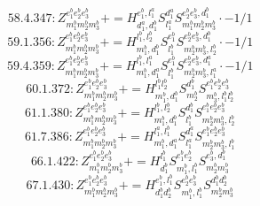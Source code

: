 \documentclass[letterpaper,10pt,fleqn,leqno,onecolumn]{article}
\begin{document}
\begin{equation} \;\;\;\;\;\;  58.4.347: Z^{e_{1}^{b}e_{2}^{b}e_{3}^{b}}_{m_{1}^{b}m_{2}^{b}m_{3}^{b}}+=H^{e_{1}^{b},l_{1}^{a}}_{d_{1}^{a},d_{1}^{b}}S^{d_{1}^{a}}_{l_{1}^{a}}S^{e_{2}^{b}e_{3}^{b},d_{1}^{b}}_{m_{1}^{b}m_{2}^{b}m_{3}^{b}}\cdot -1/1 \end{equation}
\begin{equation} \;\;\;\;\;\;  59.1.356: Z^{e_{1}^{b}e_{2}^{b}e_{3}^{b}}_{m_{1}^{b}m_{2}^{b}m_{3}^{b}}+=H^{l_{1}^{b},l_{2}^{b}}_{m_{1}^{b},d_{1}^{b}}S^{e_{1}^{b}}_{l_{1}^{b}}S^{e_{2}^{b}e_{3}^{b},d_{1}^{b}}_{m_{2}^{b}m_{3}^{b},l_{2}^{b}}\cdot -1/1 \end{equation}
\begin{equation} \;\;\;\;\;\;  59.4.359: Z^{e_{1}^{b}e_{2}^{b}e_{3}^{b}}_{m_{1}^{b}m_{2}^{b}m_{3}^{b}}+=H^{l_{1}^{b},l_{1}^{a}}_{m_{1}^{b},d_{1}^{a}}S^{e_{1}^{b}}_{l_{1}^{b}}S^{e_{2}^{b}e_{3}^{b},d_{1}^{a}}_{m_{2}^{b}m_{3}^{b},l_{1}^{a}}\cdot -1/1 \end{equation}
\begin{equation} \;\;\;\;\;\;  60.1.372: Z^{e_{1}^{b}e_{2}^{b}e_{3}^{b}}_{m_{1}^{b}m_{2}^{b}m_{3}^{b}}+=H^{l_{1}^{b}l_{2}^{b}}_{m_{1}^{b},d_{1}^{b}}S^{d_{1}^{b}}_{m_{2}^{b}}S^{e_{1}^{b}e_{2}^{b}e_{3}^{b}}_{m_{3}^{b},l_{1}^{b}l_{2}^{b}} \end{equation}
\begin{equation} \;\;\;\;\;\;  61.1.380: Z^{e_{1}^{b}e_{2}^{b}e_{3}^{b}}_{m_{1}^{b}m_{2}^{b}m_{3}^{b}}+=H^{l_{1}^{b},l_{2}^{b}}_{m_{1}^{b},d_{1}^{b}}S^{d_{1}^{b}}_{l_{1}^{b}}S^{e_{1}^{b}e_{2}^{b}e_{3}^{b}}_{m_{2}^{b}m_{3}^{b},l_{2}^{b}} \end{equation}
\begin{equation} \;\;\;\;\;\;  61.7.386: Z^{e_{1}^{b}e_{2}^{b}e_{3}^{b}}_{m_{1}^{b}m_{2}^{b}m_{3}^{b}}+=H^{l_{1}^{a},l_{1}^{b}}_{m_{1}^{b},d_{1}^{a}}S^{d_{1}^{a}}_{l_{1}^{a}}S^{e_{1}^{b}e_{2}^{b}e_{3}^{b}}_{m_{2}^{b}m_{3}^{b},l_{1}^{b}} \end{equation}
\begin{equation} \;\;\;\;\;\;  66.1.422: Z^{e_{1}^{b}e_{2}^{b}e_{3}^{b}}_{m_{1}^{b}m_{2}^{b}m_{3}^{b}}+=H^{l_{1}^{b}}_{d_{1}^{b}}S^{e_{1}^{b}e_{2}^{b}}_{m_{1}^{b},l_{1}^{b}}S^{e_{3}^{b},d_{1}^{b}}_{m_{2}^{b}m_{3}^{b}} \end{equation}
\begin{equation} \;\;\;\;\;\;  67.1.430: Z^{e_{1}^{b}e_{2}^{b}e_{3}^{b}}_{m_{1}^{b}m_{2}^{b}m_{3}^{b}}+=H^{e_{1}^{b},l_{1}^{b}}_{d_{1}^{b}d_{2}^{b}}S^{e_{2}^{b}e_{3}^{b}}_{m_{1}^{b},l_{1}^{b}}S^{d_{1}^{b}d_{2}^{b}}_{m_{2}^{b}m_{3}^{b}} \end{equation}
\end{document}
